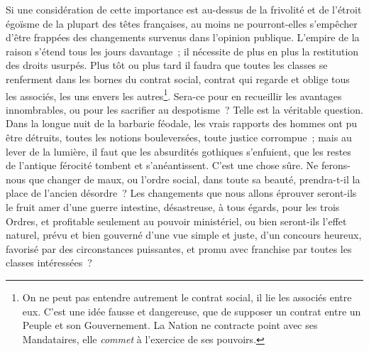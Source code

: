 \documentclass[french,twoside]{book} %
\begin{document}
Si une considération de cette importance est au-dessus de la frivolité et de l’étroit égoïsme de la plupart des têtes françaises, au moins ne pourront-elles s’empêcher d’être frappées des changements survenus dans l’opinion publique. L’empire de la raison s’étend tous les jours davantage ; il nécessite de plus en plus la restitution des droits usurpés. Plus tôt ou plus tard il faudra que toutes les classes se renferment dans les bornes du contrat social, contrat qui regarde et oblige tous les associés, les uns envers les autres\footnote{On ne peut pas entendre autrement le contrat social, il lie les associés entre eux. C’est une idée fausse et dangereuse, que de supposer un contrat entre un Peuple et son Gouvernement. La Nation ne contracte point avec ses Mandataires, elle {\itshape commet} à l’exercice de ses pouvoirs.}. Sera-ce pour en recueillir les avantages innombrables, ou pour les sacrifier au despotisme ? Telle est la véritable question. Dans la longue nuit de la barbarie féodale, les vrais rapports des hommes ont pu être détruits, toutes les notions bouleversées, toute justice corrompue ; mais au lever de la lumière, il faut que les absurdités gothiques s’enfuient, que les restes de l’antique férocité tombent et s’anéantissent. C’est une chose sûre. Ne ferons-nous que changer de maux, ou l’ordre social, dans toute sa beauté, prendra-t-il la place de l’ancien désordre ? Les changements que nous allons éprouver seront-ils le fruit amer d’une guerre intestine, désastreuse, à tous égards, pour les trois Ordres, et profitable seulement au pouvoir ministériel, ou bien seront-ils l’effet naturel, prévu et bien gouverné d’une vue simple et juste, d’un concours heureux, favorisé par des circonstances puissantes, et promu avec franchise par toutes les classes intéressées ?\par
\end{document}
